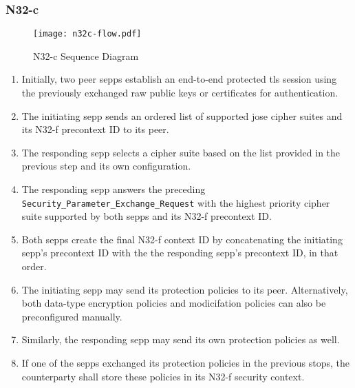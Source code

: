\subsubsection{N32-c}

\begin{figure}[h!]
    \centering
    \texttt{[image: n32c-flow.pdf]}
    \caption{N32-c Sequence Diagram}
    \label{fig:n32c-sequence}
\end{figure}

\begin{enumerate}[wide, labelwidth=!, labelindent=0pt]
    \item Initially, two peer \glspl{sepp} establish an end-to-end protected \gls{tls} session using the previously exchanged raw public keys or certificates for authentication.
    \item The initiating \gls{sepp} sends an ordered list of supported \gls{jose} cipher suites and its N32-f precontext ID to its peer.
    \item The responding \gls{sepp} selects a cipher suite based on the list provided in the previous step and its own configuration.
    \item The responding \gls{sepp} answers the preceding \texttt{Security\_Parameter\_Exchange\_Request} with the highest priority cipher suite supported by both \glspl{sepp} and its N32-f precontext ID.
    \item Both \glspl{sepp} create the final N32-f context ID by concatenating the initiating \gls{sepp}'s precontext ID with the the responding \gls{sepp}'s precontext ID, in that order.
    \item The initiating \gls{sepp} may send its protection policies to its peer. Alternatively, both data-type encryption policies and modicifation policies can also be preconfigured manually.
    \item Similarly, the responding \gls{sepp} may send its own protection policies as well.
    \item If one of the \glspl{sepp} exchanged its protection policies in the previous stops, the counterparty shall store these policies in its N32-f security context.

\end{enumerate}
